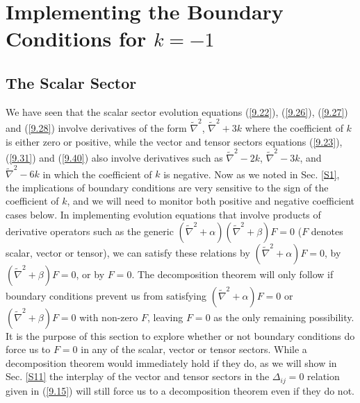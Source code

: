 \documentclass[aps,onecolumn,10pt]{revtex4}
\numberwithin{equation}{section}
\numberwithin{equation}{section}
\begin{document}
\section{Implementing the Boundary Conditions for $k=-1$}
\label{S10}
\subsection{The Scalar Sector}

We have seen that the scalar sector evolution equations (\ref{9.22}), (\ref{9.26}), (\ref{9.27}) and (\ref{9.28}) involve derivatives of the form $\tilde{\nabla}^2$, $\tilde{\nabla}^2+3k$ where the coefficient of $k$ is either zero or positive, while the vector and tensor sectors equations (\ref{9.23}), (\ref{9.31}) and (\ref{9.40}) also involve derivatives such as $\tilde{\nabla}^2-2k$, $\tilde{\nabla}^2-3k$, and $\tilde{\nabla}^2-6k$ in which the coefficient of $k$ is negative. Now as we noted in Sec. \ref{S1}, the implications of boundary conditions are very sensitive to the sign of the coefficient of $k$, and we will need to monitor both positive and negative coefficient cases below. In implementing evolution equations that involve products of derivative operators such as the generic $(\tilde{\nabla}^2+\alpha)(\tilde{\nabla}^2+\beta)F=0$ ($F$ denotes scalar, vector or tensor), we can satisfy these relations by $(\tilde{\nabla}^2+\alpha)F=0$,  by $(\tilde{\nabla}^2+\beta)F=0$, or by $F=0$. The decomposition theorem will only follow if boundary conditions prevent us from satisfying $(\tilde{\nabla}^2+\alpha)F=0$ or   $(\tilde{\nabla}^2+\beta)F=0$ with non-zero $F$, leaving $F=0$ as the only remaining possibility. It is the purpose of this section to explore whether or not boundary conditions do force us to $F=0$ in any of the scalar, vector or tensor sectors. While a decomposition theorem would immediately hold if they do, as we will show in Sec. \ref{S11} the interplay of the vector and tensor sectors in the $\Delta_{ij}=0$ relation given in (\ref{9.15}) will still force us to a decomposition theorem even if they do not.
\end{document}
